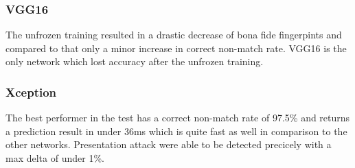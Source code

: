 

\subsubsection{VGG16}
The unfrozen training resulted in a drastic decrease of bona fide fingerpints and compared to that only a minor increase in correct non-match rate.
VGG16 is the only network which lost accuracy after the unfrozen training.



\subsubsection{Xception}
The best performer in the test has a correct non-match rate of 97.5\% and returns a prediction result in under 36ms which is quite fast as well in comparison to the other networks.
Presentation attack were able to be detected precicely with a max delta of under 1\%.





\endinput





\subsubsection{EfficientNet B0}

The only CMR over 90\% is achieved by EfficientNet B0 which is the second best performer over all.
Bona fide fingerprints were correctly detected with an accuracy of 92.5\%.

\predictiontables{efficientnet}



\medskip
Out of the three tested neural networks MobileNet was performing the best on average thanks to it's high true negative detection rate.
The other two networks however have a better true positive rate.
\bigskip\hrule



\subsection{MobileNet}
Bona fide fingerprints were correctly detected with an accuracy of 89.1\%, while presentation attacks were detected correctly with 93.19\%.
None of the materials show significant variance from each other and are within a range of 92.0\% and 94.7\%.
Liquid Ecoflex shows the worst deception potential.


